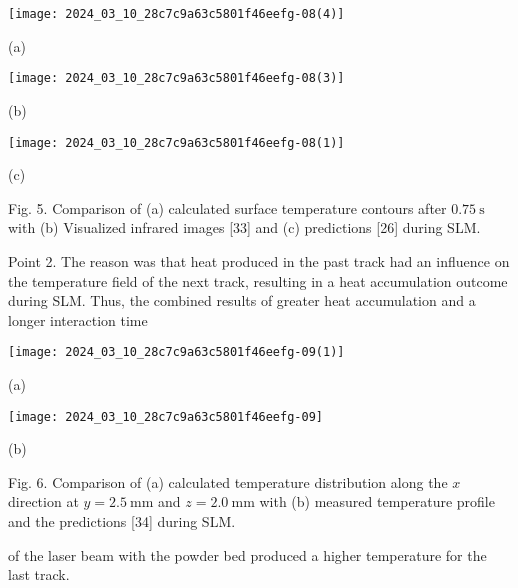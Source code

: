 \documentclass[10pt]{article}
\begin{document}
\begin{center}
\texttt{[image: 2024\_03\_10\_28c7c9a63c5801f46eefg-08(4)]}
\end{center}

(a)

\begin{center}
\texttt{[image: 2024\_03\_10\_28c7c9a63c5801f46eefg-08(3)]}
\end{center}

(b)

\begin{center}
\texttt{[image: 2024\_03\_10\_28c7c9a63c5801f46eefg-08(1)]}
\end{center}

(c)

Fig. 5. Comparison of (a) calculated surface temperature contours after $0.75 \mathrm{~s}$ with (b) Visualized infrared images [33] and (c) predictions [26] during SLM.

Point 2. The reason was that heat produced in the past track had an influence on the temperature field of the next track, resulting in a heat accumulation outcome during SLM. Thus, the combined results of greater heat accumulation and a longer interaction time

\begin{center}
\texttt{[image: 2024\_03\_10\_28c7c9a63c5801f46eefg-09(1)]}
\end{center}

(a)

\begin{center}
\texttt{[image: 2024\_03\_10\_28c7c9a63c5801f46eefg-09]}
\end{center}

(b)

Fig. 6. Comparison of (a) calculated temperature distribution along the $x$ direction at $y=2.5 \mathrm{~mm}$ and $z=2.0 \mathrm{~mm}$ with (b) measured temperature profile and the predictions [34] during SLM.

of the laser beam with the powder bed produced a higher temperature for the last track.
\end{document}

